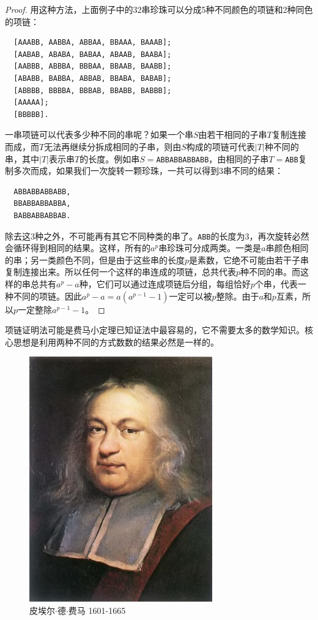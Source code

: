 \documentclass[b5paper]{ctexart}
\begin{document}
\begin{proof}
用这种方法，上面例子中的32串珍珠可以分成5种不同颜色的项链和2种同色的项链：

\begin{verbatim}
  [AAABB, AABBA, ABBAA, BBAAA, BAAAB];
  [AABAB, ABABA, BABAA, ABAAB, BAABA];
  [AABBB, ABBBA, BBBAA, BBAAB, BAABB];
  [ABABB, BABBA, ABBAB, BBABA, BABAB];
  [ABBBB, BBBBA, BBBAB, BBABB, BABBB];
  [AAAAA];
  [BBBBB].
\end{verbatim}

一串项链可以代表多少种不同的串呢？如果一个串$S$由若干相同的子串$T$复制连接而成，而$T$无法再继续分拆成相同的子串，则由$S$构成的项链可代表$|T|$种不同的串，其中$|T|$表示串$T$的长度。例如串$S=$\texttt{ABBABBABBABB}，由相同的子串$T=$\texttt{ABB}复制多次而成，如果我们一次旋转一颗珍珠，一共可以得到3串不同的结果：

\begin{verbatim}
  ABBABBABBABB,
  BBABBABBABBA,
  BABBABBABBAB.
\end{verbatim}

除去这3种之外，不可能再有其它不同种类的串了。\texttt{ABB}的长度为3，再次旋转必然会循环得到相同的结果。这样，所有的$a^p$串珍珠可分成两类。一类是$a$串颜色相同的串；另一类颜色不同，但是由于这些串的长度$p$是素数，它绝不可能由若干子串复制连接出来。所以任何一个这样的串连成的项链，总共代表$p$种不同的串。而这样的串总共有$a^p - a$种，它们可以通过连成项链后分组，每组恰好$p$个串，代表一种不同的项链。因此$a^p-a = a(a^{p-1}-1)$一定可以被$p$整除。由于$a$和$p$互素，所以$p$一定整除$a^{p-1}-1$。
\end{proof}

项链证明法可能是费马小定理已知证法中最容易的，它不需要太多的数学知识。核心思想是利用两种不同的方式数数的结果必然是一样的。

\begin{figure}
  \centering %
 \includegraphics[scale=0.4]{img/Fermat.jpg}
 \captionsetup{labelformat=empty}
 \caption{皮埃尔$\cdot$德$\cdot$费马 1601-1665}
 \label{fig:Fermat}
\end{figure}
\end{document}
